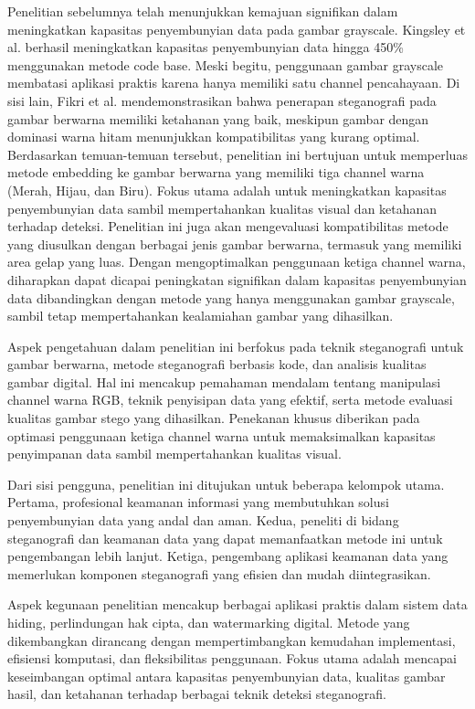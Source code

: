 \documentclass{ittelkom}
\begin{document}
Penelitian sebelumnya telah menunjukkan kemajuan signifikan dalam meningkatkan
kapasitas penyembunyian data pada gambar grayscale. Kingsley et al.
\cite{kingsley2020improving} berhasil meningkatkan kapasitas penyembunyian data
hingga 450\% menggunakan metode code base. Meski begitu, penggunaan gambar
grayscale membatasi aplikasi praktis karena hanya memiliki satu channel
pencahayaan. Di sisi lain, Fikri et al. \cite{fikri2022optimasi}
mendemonstrasikan bahwa penerapan steganografi pada gambar berwarna memiliki
ketahanan yang baik, meskipun gambar dengan dominasi warna hitam menunjukkan
kompatibilitas yang kurang optimal. Berdasarkan temuan-temuan tersebut,
penelitian ini bertujuan untuk memperluas metode embedding ke gambar berwarna
yang memiliki tiga channel warna (Merah, Hijau, dan Biru). Fokus utama adalah
untuk meningkatkan kapasitas penyembunyian data sambil mempertahankan kualitas
visual dan ketahanan terhadap deteksi. Penelitian ini juga akan mengevaluasi
kompatibilitas metode yang diusulkan dengan berbagai jenis gambar berwarna,
termasuk yang memiliki area gelap yang luas. Dengan mengoptimalkan penggunaan
ketiga channel warna, diharapkan dapat dicapai peningkatan signifikan dalam
kapasitas penyembunyian data dibandingkan dengan metode yang hanya menggunakan
gambar grayscale, sambil tetap mempertahankan kealamiahan gambar yang
dihasilkan.

Aspek pengetahuan dalam penelitian ini berfokus pada teknik steganografi untuk
gambar berwarna, metode steganografi berbasis kode, dan analisis kualitas
gambar digital. Hal ini mencakup pemahaman mendalam tentang manipulasi channel
warna RGB, teknik penyisipan data yang efektif, serta metode evaluasi kualitas
gambar stego yang dihasilkan. Penekanan khusus diberikan pada optimasi
penggunaan ketiga channel warna untuk memaksimalkan kapasitas penyimpanan data
sambil mempertahankan kualitas visual.

Dari sisi pengguna, penelitian ini ditujukan untuk beberapa kelompok utama.
Pertama, profesional keamanan informasi yang membutuhkan solusi penyembunyian
data yang andal dan aman. Kedua, peneliti di bidang steganografi dan keamanan
data yang dapat memanfaatkan metode ini untuk pengembangan lebih lanjut.
Ketiga, pengembang aplikasi keamanan data yang memerlukan komponen steganografi
yang efisien dan mudah diintegrasikan.

Aspek kegunaan penelitian mencakup berbagai aplikasi praktis dalam sistem data
hiding, perlindungan hak cipta, dan watermarking digital. Metode yang
dikembangkan dirancang dengan mempertimbangkan kemudahan implementasi,
efisiensi komputasi, dan fleksibilitas penggunaan. Fokus utama adalah mencapai
keseimbangan optimal antara kapasitas penyembunyian data, kualitas gambar
hasil, dan ketahanan terhadap berbagai teknik deteksi steganografi.
\end{document}
